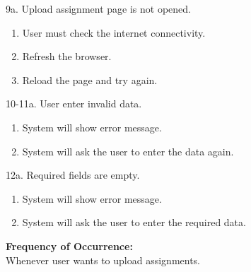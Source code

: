 9a. Upload assignment page is not opened.
\begin{enumerate}
\item User must check the internet connectivity.
\item Refresh the browser.
\item Reload the page and try again.
\end{enumerate}
10-11a. User enter invalid data.
\begin{enumerate}
\item System will show error message.
\item System will ask the user to enter the data again.
\end{enumerate}
12a. Required fields are empty.
\begin{enumerate}
\item System will show error message.
\item System will ask the user to enter the required data. 
\end{enumerate}
\textbf{Frequency of Occurrence:}\\
Whenever user wants to upload assignments.



